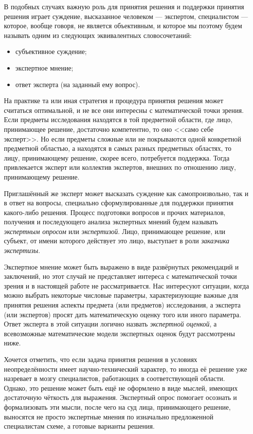В подобных случаях важную роль для принятия решения и поддержки принятия решения играет суждение, высказанное человеком --- экспертом, специалистом --- которое, вообще говоря, не является объективным, и которое мы поэтому будем называть одним из следующих эквивалентных словосочетаний:
 \begin{itemize}
	\item субъективное суждение;
	\item экспертное мнение;
	\item ответ эксперта (на заданный ему вопрос). 
 \end{itemize}

На практике та или иная стратегия и процедура принятия решения может считаться оптимальной, и не все они интересны с математической точки зрения. Если предметы исследования находятся в той предметной области, где лицо, принимающее решение, достаточно компетентно, то оно <<само себе эксперт>>. Но если предметы сложные или не покрываются одной конкретной предметной областью, а находятся в самых разных предметных областях, то лицу, принимающему решение, скорее всего, потребуется  поддержка. Тогда привлекается эксперт или коллектив экспертов, внешних по отношению лицу, принимающему решение.
 
Приглашённый же эксперт может высказать суждение как самопроизвольно, так и в ответ на вопросы, специально сформулированные для поддержки принятия какого-либо решения. Процесс подготовки вопросов и прочих материалов, получения и последующего анализа экспертных мнений будем называть {\sl экспертным опросом} или {\sl экспертизой}. Лицо, принимающее решение, или субъект, от имени которого действует это лицо, выступает в роли {\sl заказчика экспертизы}.
 
Экспертное мнение может быть выражено в виде развёрнутых рекомендаций и заключений, но этот случай не представляет интереса с математической точки зрения и в настоящей работе не рассматривается. Нас интересуют ситуации, когда можно выбрать некоторые числовые параметры, характеризующие важные для принятия решения аспекты предмета (или предметов) исследования, а эксперта (или экспертов) просят дать математическую оценку того или иного параметра. Ответ эксперта в этой ситуации логично назвать {\sl экспертной оценкой}, а всевозможные математические модели экспертных оценок будут рассмотрены ниже.  
 
Хочется отметить, что если задача принятия решения в условиях неопределённости имеет научно-технический характер, то иногда её решение уже назревает в мозгу специалистов, работающих в соответствующей области. Однако, это решение может быть ещё не оформлено в виде мыслей, имеющих достаточную чёткость для выражения. Экспертный опрос помогает осознать и формализовать эти мысли, после чего на суд лица, принимающего решение, выносятся не просто экспертные мнения по изначально предложенной специалистам схеме, а готовые варианты решения. 

